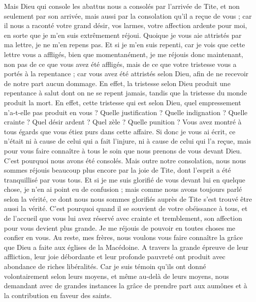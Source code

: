 \begin{multicols}{2}
Mais Dieu qui console les abattus nous a consolés par l’arrivée de Tite,
et non seulement par son arrivée, mais aussi par la consolation qu'il a reçue de vous ; car il nous a raconté votre grand désir, vos larmes, votre affection ardente pour moi, en sorte que je m'en suis extrêmement réjoui.
Quoique je vous aie attristés par ma lettre, je ne m'en repens pas. Et si je m'en suis repenti, car je vois que cette lettre vous a affligés, bien que momentanément,
je me réjouis donc maintenant, non pas de ce que vous avez été affligés, mais de ce que votre tristesse vous a portés à la repentance ; car vous avez été attristés selon Dieu, afin de ne recevoir de notre part aucun dommage.
En effet, la tristesse selon Dieu produit une repentance à salut dont on ne se repent jamais, tandis que la tristesse du monde produit la mort.
En effet, cette tristesse qui est selon Dieu, quel empressement n’a-t-elle pas produit en vous ? Quelle justification ? Quelle indignation ? Quelle crainte ? Quel désir ardent ? Quel zèle ? Quelle punition ? Vous avez montré à tous égards que vous étiez purs dans cette affaire.
Si donc je vous ai écrit, ce n’était ni à cause de celui qui a fait l’injure, ni à cause de celui qui l’a reçue, mais pour vous faire connaître à tous le soin que nous prenons de vous devant Dieu.
C'est pourquoi nous avons été consolés. Mais outre notre consolation, nous nous sommes réjouis beaucoup plus encore par la joie de Tite, dont l’esprit a été tranquillisé par vous tous.
Et si je me suis glorifié de vous devant lui en quelque chose, je n’en ai point eu de confusion ; mais comme nous avons toujours parlé selon la vérité, ce dont nous nous sommes glorifiés auprès de Tite s’est trouvé être aussi la vérité.
C'est pourquoi quand il se souvient de votre obéissance à tous, et de l’accueil que vous lui avez réservé avec crainte et tremblement, son affection pour vous devient plus grande.
Je me réjouis de pouvoir en toutes choses me confier en vous.
\VerseOne{}Au reste, mes frères, nous voulons vous faire connaître la grâce que Dieu a faite aux églises de la Macédoine.
A travers la grande épreuve de leur affliction, leur joie débordante et leur profonde pauvreté ont produit avec abondance de riches libéralités.
Car je suis témoin qu'ils ont donné volontairement selon leurs moyens, et même au-delà de leurs moyens,
nous demandant avec de grandes instances la grâce de prendre part aux aumônes et à la contribution en faveur des saints.

\end{multicols}
